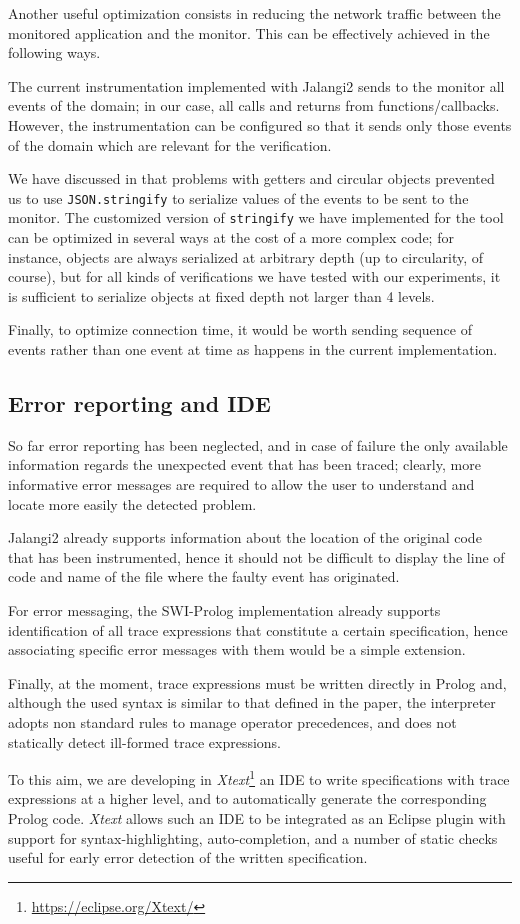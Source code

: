 Another useful optimization consists in reducing the network traffic 
between the monitored application and the monitor.
This can be effectively achieved in the following ways.

The current instrumentation implemented with Jalangi2 sends to the monitor
all events of the domain; in our case, all calls and returns from functions/callbacks.
However, the instrumentation can be configured so that it sends only those events 
of the domain which are relevant for the verification.

We have discussed in  that problems with getters and circular objects
prevented us to use \lstinline{JSON.stringify} to serialize values of the events to be sent to the
monitor. The customized version of \lstinline{stringify} we have implemented for the tool
can be optimized in several ways at the cost of a more complex code; for instance,
objects are always serialized at arbitrary depth (up to circularity, of course), but for
all kinds of verifications we have tested with our experiments, it is sufficient to serialize objects
at fixed depth not larger than 4 levels.

Finally, to optimize connection time, it would be worth sending sequence of events rather than one
event at time as happens in the current implementation.

\subsection{Error reporting and IDE}
So far error reporting has been neglected, and in case of failure the only available information
regards the unexpected event that has been traced; clearly, more informative error messages
are required to allow the user to understand and locate more easily the detected problem.

Jalangi2 already supports information about the location of the original code that has been
instrumented, hence it should not be difficult to display the line of code and name of the file where
the faulty event has originated.

For error messaging, the SWI-Prolog implementation already supports identification of
all trace expressions that constitute a certain specification, hence associating specific error messages with them
would be a simple extension.

Finally, at the moment, trace expressions must be written directly in Prolog and, although the used syntax
is similar to that defined in the paper, the interpreter adopts non standard rules to manage operator precedences,
and does not statically detect ill-formed trace expressions.

To this aim, we are developing in \textit{Xtext}\footnote{\url{https://eclipse.org/Xtext/}} an IDE
to write specifications with trace expressions at a higher level, and to automatically generate
the corresponding Prolog code. \textit{Xtext} allows such an IDE to be integrated as an Eclipse plugin
with support for syntax-highlighting, auto-completion,
and a number of static checks useful for early error detection of the written specification.
